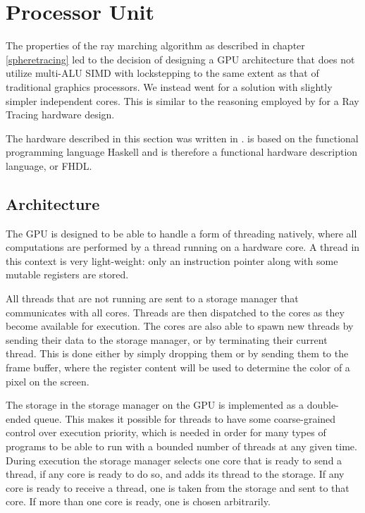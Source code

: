 	\section{Processor Unit} \label{implproc}

		The properties of the ray marching algorithm as described in chapter
		\ref{spheretracing} led to the decision of designing a GPU architecture
		that does not utilize multi-ALU SIMD with lockstepping to the same extent
		as that of traditional graphics processors. We instead went for a solution
		with slightly simpler independent cores. This is similar to the reasoning
		employed by \cite{Woop2005} for a Ray Tracing hardware design.

		The hardware described in this section was written in \clash. \clash is
		based on the functional programming language Haskell and is therefore a
		functional hardware description language, or FHDL.

		\subsection{Architecture}

			The GPU is designed to be able to handle a form of threading
			natively, where all computations are performed by a thread running
			on a hardware core. A thread in this context is very light-weight:
			only an instruction pointer along with some mutable registers are
			stored.

			All threads that are not running are sent to a storage manager that
			communicates with all cores. Threads are then dispatched to the 
			cores as they become available for execution. The cores are also 
			able to spawn new threads by sending their data to the storage 
			manager, or by terminating their current thread. This is done 
			either by simply dropping them or by sending them to the frame 
			buffer, where the register content will be used to determine the 
			color of a pixel on the screen.

			The storage in the storage manager on the GPU is implemented
			as a double-ended queue. This makes it possible for threads to have
			some coarse-grained control over execution priority, which is
			needed in order for many types of programs to be able to run with a
			bounded number of threads at any given time. During execution the
			storage manager selects one core that is ready to send a thread, if
			any core is ready to do so, and adds its thread to the storage. If
			any core is ready to receive a thread, one is taken from the 
			storage and sent to that core. If more than one core is ready, one
			is chosen arbitrarily.

